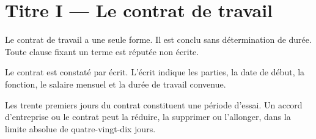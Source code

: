 \section{Titre I --- Le contrat de travail}

\label{art:forme-unique}
Le contrat de travail a une seule forme. Il est conclu sans détermination
de durée. Toute clause fixant un terme est réputée non écrite.

\label{art:ecrit}
Le contrat est constaté par écrit. L'écrit indique les parties, la date de
début, la fonction, le salaire mensuel et la durée de travail convenue.

\label{art:essai}
Les trente premiers jours du contrat constituent une période d'essai. Un
accord d'entreprise ou le contrat peut la réduire, la supprimer ou l'allonger,
dans la limite absolue de quatre-vingt-dix jours.
